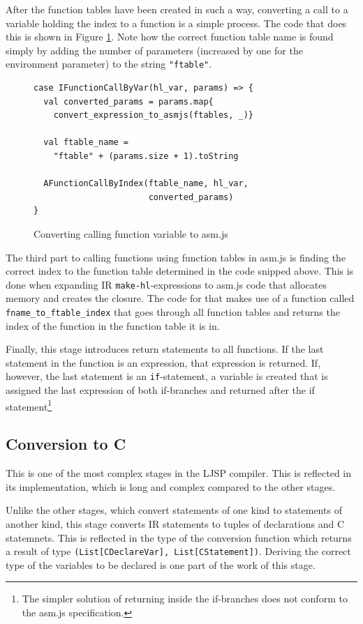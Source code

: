 \documentclass[11pt]{report}
\begin{document}
After the function tables have been created in such a way, converting a call to a variable holding the index to a function is a simple process. The code that does this is shown in Figure \ref{iconvasmjs2}. Note how the correct function table name is found simply by adding the number of parameters (increased by one for the environment parameter) to the string \texttt{"ftable"}.

\begin{figure}[ht]
\begin{lstlisting}
case IFunctionCallByVar(hl_var, params) => {
  val converted_params = params.map{
    convert_expression_to_asmjs(ftables, _)}
    
  val ftable_name = 
    "ftable" + (params.size + 1).toString
    
  AFunctionCallByIndex(ftable_name, hl_var, 
                       converted_params)
}
\end{lstlisting}
\caption{Converting calling function variable to asm.js}
\label{iconvasmjs2}
\end{figure}

The third part to calling functions using function tables in asm.js is finding the correct index to the function table determined in the code snipped above. This is done when expanding IR \texttt{make-hl}-expressions to asm.js code that allocates memory and creates the closure. The code for that makes use of a function called \texttt{fname_to_ftable_index} that goes through all function tables and returns the index of the function in the function table it is in.

Finally, this stage introduces return statements to all functions. If the last statement in the function is an expression, that expression is returned. If, however, the last statement is an \texttt{if}-statement, a variable is created that is assigned the last expression of both if-branches and returned after the if statement\footnote{The simpler solution of returning inside the if-branches does not conform to the asm.js specification.}

\subsection{Conversion to C}
This is one of the most complex stages in the LJSP compiler. This is reflected in its implementation, which is long and complex compared to the other stages.

Unlike the other stages, which convert statements of one kind to statements of another kind, this stage converts IR statements to tuples of declarations and C statemnets. This is reflected in the type of the conversion function which returns a result of type \texttt{(List[CDeclareVar], List[CStatement])}. Deriving the correct type of the variables to be declared is one part of the work of this stage.
\end{document}
